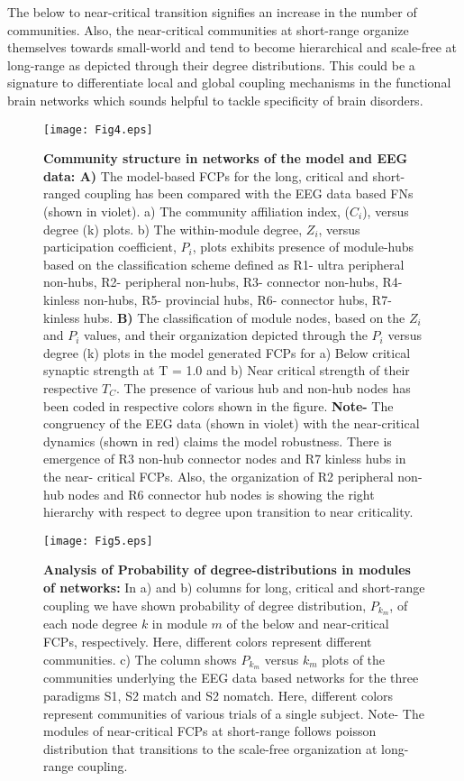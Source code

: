 \documentclass[preprintnumbers,amsmath,amssymb,onecolumn]{revtex4}
\begin{document}
The below to near-critical transition signifies an increase in the number of communities. Also, the near-critical communities at short-range organize themselves towards small-world and tend to become hierarchical and scale-free at long-range as depicted through their degree distributions. This could be a signature to differentiate local and global coupling mechanisms in the functional brain networks which sounds helpful to tackle specificity of brain disorders. 

\begin{figure}
\label{fig4}
\begin{center}
\texttt{[image: Fig4.eps]}
\caption{\textbf{Community structure in networks of the model and EEG data: A)}
The model-based FCPs for the long, critical and short-ranged coupling
has been compared with the EEG data based FNs (shown in violet). a)
The community affiliation index, ($C_{i}$), versus degree (k) plots.
b) The within-module degree, $Z_{i}$, versus participation coefficient,
$P_{i}$, plots exhibits presence of module-hubs based on the classification
scheme defined as R1- ultra peripheral non-hubs, R2- peripheral non-hubs,
R3- connector non-hubs, R4- kinless non-hubs, R5- provincial hubs,
R6- connector hubs, R7- kinless hubs. \textbf{B) }The classification
of module nodes, based on the $Z_{i}$ and $P_{i}$ values, and their
organization depicted through the $P_{i}$ versus degree (k) plots
in the model generated FCPs for a) Below critical synaptic strength
at T = 1.0 and b) Near critical strength of their respective $T_{C}$.
The presence of various hub and non-hub nodes has been coded in respective
colors shown in the figure. \textbf{Note- }The congruency of the EEG
data (shown in violet) with the near-critical dynamics (shown in red)
claims the model robustness. There is emergence of R3 non-hub connector
nodes and R7 kinless hubs in the near- critical FCPs. Also, the organization
of R2 peripheral non-hub nodes and R6 connector hub nodes is showing
the right {hierarchy} with respect to degree upon transition to near
criticality.} 
\end{center}
\end{figure}

\begin{figure}
\label{fig5}
\begin{center}
\texttt{[image: Fig5.eps]}
\caption{\textbf{Analysis of Probability of degree-distributions in modules
of networks: }In a) and b) columns for long, critical and short-range
coupling we have shown probability of degree distribution, $P_{k_{m}}$,
of each node degree $k$ in module $m$ of the below and near-critical
FCPs, respectively. Here, different colors represent different communities.
c) The column shows $P_{k_{m}}$ versus $k_{m}$ plots of the communities
underlying the EEG data based networks for the three paradigms S1,
S2 match and S2 nomatch. Here, different colors represent communities
of various trials of a single subject. Note- The modules of near-critical
FCPs at short-range follows poisson distribution that transitions
to the scale-free organization at long-range coupling.} 
\end{center}
\end{figure}
\end{document}
